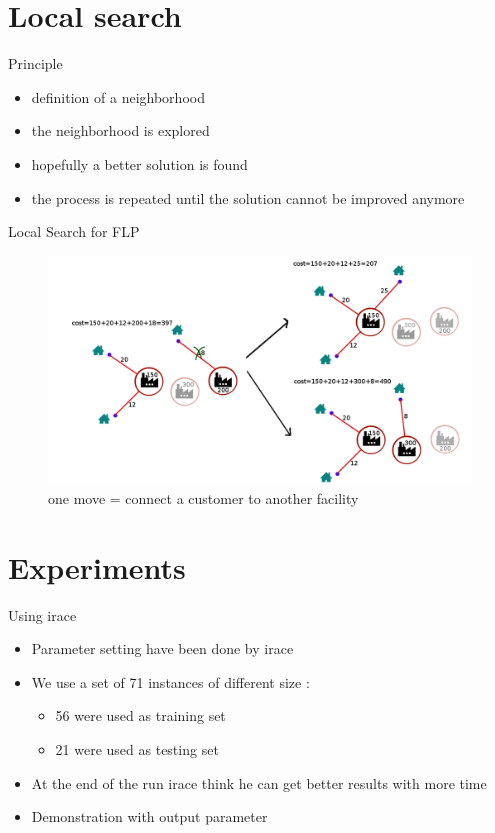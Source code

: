 \documentclass{beamer}
\begin{document}
\section{Local search}

\begin{frame}{Principle}
    \begin{itemize}
        \item definition of a neighborhood
        \item the neighborhood is explored
        \item hopefully a better solution is found
        \item the process is repeated until the solution cannot be improved anymore
    \end{itemize}
\end{frame}

\begin{frame}{Local Search for FLP}
    \begin{figure}
        \centering
        \includegraphics[scale=0.27]{schemalstot}
        \caption{ one move = connect a customer to another facility}
    \end{figure}
\end{frame}

\section{Experiments}

\begin{frame}{Using irace}
\begin{itemize}
\item
Parameter setting have been done by irace
\item
We use a set of 71 instances of different size :
\begin{itemize}
\item
56 were used as training set
\item
21 were used as testing set
\end{itemize}
\item
At the end of the run irace think he can get better results with more time
\item<2->
Demonstration with output parameter
\end{itemize}
\end{frame}
\end{document}

